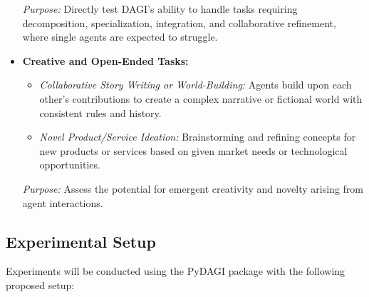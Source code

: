 \documentclass[12pt]{amsart}
\begin{document}
\begin{itemize}[leftmargin=*]
\begin{itemize}
        \end{itemize}
        \textit{Purpose:} Directly test DAGI's ability to handle tasks requiring decomposition, specialization, integration, and collaborative refinement, where single agents are expected to struggle.
    \item \textbf{Creative and Open-Ended Tasks:}
        \begin{itemize}
            \item \textit{Collaborative Story Writing or World-Building:} Agents build upon each other's contributions to create a complex narrative or fictional world with consistent rules and history.
            \item \textit{Novel Product/Service Ideation:} Brainstorming and refining concepts for new products or services based on given market needs or technological opportunities.
        \end{itemize}
        \textit{Purpose:} Assess the potential for emergent creativity and novelty arising from agent interactions.
\end{itemize}

\subsection{Experimental Setup}
\label{subsec:experimental_setup}
Experiments will be conducted using the PyDAGI package with the following proposed setup:
\end{document}

